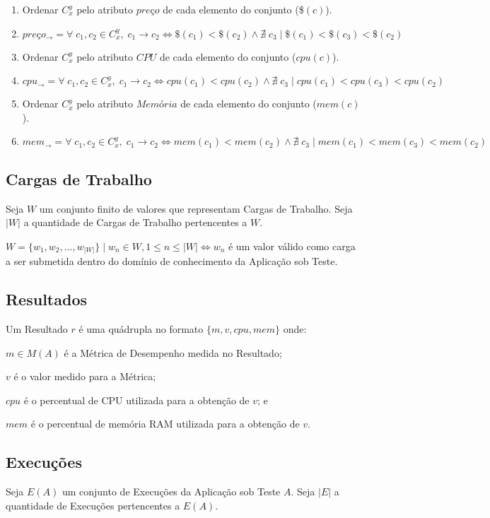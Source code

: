 \begin{enumerate}
  \item Ordenar $C_x^y$ pelo atributo $preço$ de cada elemento do conjunto (\$$(c)$).
  \item $preço_{\to} = \forall\; c_1, c_2 \in C_x^y,\; c_1 \to c_2 \iff \$(c_1) < \$(c_2) \land \nexists\; c_3\;|\; \$(c_1) < \$(c_3) < \$(c_2)$
  \item Ordenar $C_x^y$ pelo atributo $CPU$ de cada elemento do conjunto ($cpu(c)$).
  \item $cpu_{\to} = \forall\; c_1, c_2 \in C_x^y,\; c_1 \to c_2 \iff cpu(c_1) < cpu(c_2) \land \nexists\; c_3\;|\; cpu(c_1) < cpu(c_3) < cpu(c_2)$
  \item Ordenar $C_x^y$ pelo atributo $Memória$ de cada elemento do conjunto ($mem(c)$).
  \item $mem_{\to} = \forall\; c_1, c_2 \in C_x^y,\; c_1 \to c_2 \iff mem(c_1) < mem(c_2) \land \nexists\; c_3\;|\; mem(c_1) < mem(c_3) < mem(c_2)$
\end{enumerate}

\subsection{Cargas de Trabalho}
Seja $W$ um conjunto finito de valores que representam Cargas de Trabalho. Seja 
$|W|$ a quantidade de Cargas de Trabalho pertencentes a $W$.

$W = \{w_1, w_2, \dotsc, w_{|W|}\}\; | \; w_n \in W, 1 \leq n \leq |W| \iff w_n $ 
é um valor válido como carga a ser submetida dentro do domínio de conhecimento 
da Aplicação sob Teste.

\subsection{Resultados}
Um Resultado $r$ é uma quádrupla no formato $\{m, v, cpu, mem\}$ onde:

$m \in M(A)$ é a Métrica de Desempenho medida no Resultado;

$v$ é o valor medido para a Métrica;

$cpu$ é o percentual de CPU utilizada para a obtenção de $v$; e

$mem$ é o percentual de memória RAM utilizada para a obtenção de $v$.

\subsection{Execuções}
Seja $E(A)$ um conjunto de Execuções da Aplicação sob Teste $A$. Seja $|E|$ a 
quantidade de Execuções pertencentes a $E(A)$.


